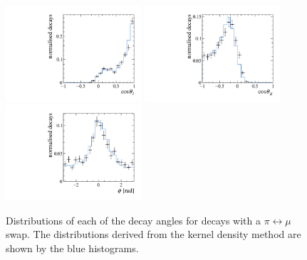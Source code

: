 \begin{figure}[!hb]
\centering
\includegraphics[width=0.45\textwidth]{figs/kpimm/selection/jpsi_pimu_costhetal.pdf}
\includegraphics[width=0.45\textwidth]{figs/kpimm/selection/jpsi_pimu_costhetak.pdf}
\includegraphics[width=0.45\textwidth]{figs/kpimm/selection/jpsi_pimu_phi.pdf}
\caption{Distributions of each of the decay angles for \BdToJPsiKpi decays with a $\pi\leftrightarrow\mu$ swap. The distributions derived from the kernel density method are shown by the blue histograms.}
\label{fig:appendix::kernel:angles}
\end{figure}